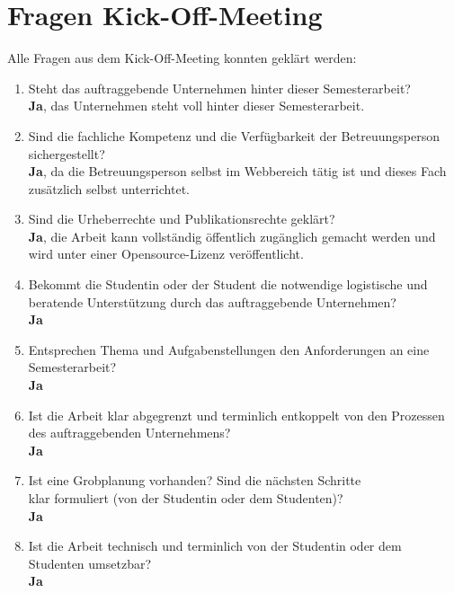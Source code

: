 \documentclass[]{scrreprt}
\begin{document}
    \section{Fragen Kick-Off-Meeting}
    Alle Fragen aus dem Kick-Off-Meeting konnten geklärt werden:
    \begin{enumerate}
        \item Steht das auftraggebende Unternehmen hinter dieser Semesterarbeit? \\
            {\bf Ja}, das Unternehmen steht voll hinter dieser Semesterarbeit.
        \item Sind die fachliche Kompetenz und die Verfügbarkeit der Betreuungsperson sichergestellt? \\
            {\bf Ja}, da die Betreuungsperson selbst im Webbereich tätig ist und dieses Fach zusätzlich selbst unterrichtet.
        \item Sind die Urheberrechte und Publikationsrechte geklärt? \\
            {\bf Ja}, die Arbeit kann vollständig öffentlich zugänglich gemacht
            werden und wird unter einer Opensource-Lizenz veröffentlicht.
        \item Bekommt die Studentin oder der Student die notwendige logistische und beratende
            Unterstützung durch das auftraggebende Unternehmen? \\
            {\bf Ja}
        \item Entsprechen Thema und Aufgabenstellungen den Anforderungen an eine Semesterarbeit? \\
            {\bf Ja}
        \item Ist die Arbeit klar abgegrenzt und terminlich entkoppelt von den Prozessen des auftraggebenden Unternehmens? \\
            {\bf Ja}
        \item Ist eine Grobplanung vorhanden? Sind die nächsten Schritte \\
            klar formuliert (von der Studentin oder dem Studenten)? \\
            {\bf Ja}
        \item Ist die Arbeit technisch und terminlich von der Studentin oder dem Studenten umsetzbar? \\
            {\bf Ja}
    \end{enumerate}
    
\end{document}
